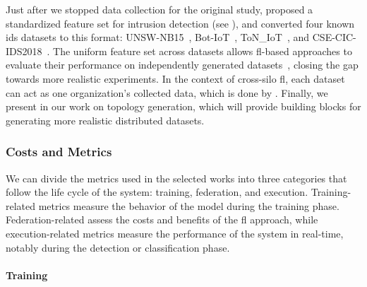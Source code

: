Just after we stopped data collection for the original study, \textcite{sarhan_StandardFeatureSet_2022} proposed a standardized feature set for intrusion detection (see ), and converted four known \gls{ids} datasets to this format: UNSW-NB15~\cite{moustafa_UNSWNB15comprehensivedata_2015}, Bot-IoT~\cite{koroniotis_developmentrealisticbotnet_2019}, ToN\_IoT~\cite{moustafa_FederatedTON_IoTWindows_2020}, and CSE-CIC-IDS2018~\cite{sharafaldin_GeneratingNewIntrusion_2018}.
The uniform feature set across datasets allows \gls{fl}-based approaches to evaluate their performance on independently generated datasets~\cite{popoola_FederatedDeepLearning_2021,decarvalhobertoli_Generalizingintrusiondetection_2023}, closing the gap towards more realistic experiments.
In the context of cross-silo \gls{fl}, each dataset can act as one organization's collected data, which is done by  \textcite{de_carvalho_bertoli_generalizing_2023}.
Finally, we present in  our work on topology generation, which will provide building blocks for generating more realistic distributed datasets.


\subsubsection{Costs and Metrics\label{sec:sota.quali.metrics}}

We can divide the metrics used in the selected works into three categories that follow the life cycle of the system: training, federation, and execution.
Training-related metrics measure the behavior of the model during the training phase.
Federation-related assess the costs and benefits of the \gls{fl} approach, while execution-related metrics measure the performance of the system in real-time, notably during the detection or classification phase.

\paragraph{Training}

